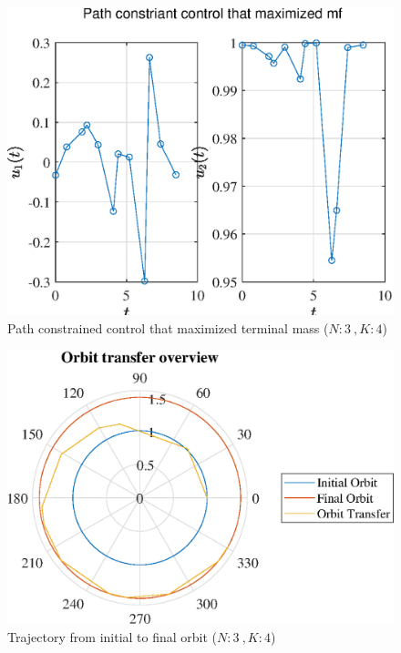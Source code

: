 \documentclass[]{article}
\begin{document}
	\begin{figure}
		\centering
		\includegraphics[scale=0.75]{path_N3_K4_C3_mf.eps}
		\caption{Path constrained control that maximized terminal mass (\(N:3\ , K:4\))}
		\label{fig:path_N3_K4_C3_mf}
	\end{figure}
	\begin{figure}
		\centering
		\includegraphics[scale=0.75]{orbit_N3_K4_C3_mf.eps}
		\caption{Trajectory from initial to final orbit (\(N:3\ , K:4\))}
		\label{fig:orbit_N3_K4_C3_mf}
	\end{figure}
\end{document}
